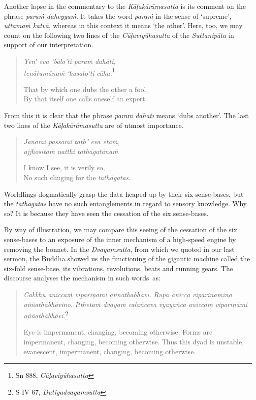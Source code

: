 Another lapse in the commentary to the \emph{Kāḷakārāmasutta} is its comment on the phrase \emph{paraṁ daheyyaṁ}. It takes the word \emph{paraṁ} in the sense of `supreme', \emph{uttamaṁ katvā}, whereas in this context it means `the other'. Here, too, we may count on the following two lines of the \emph{Cūḷaviyūhasutta} of the \emph{Suttanipāta} in support of our interpretation.

\begin{quote}
\emph{Yen' eva `bālo'ti paraṁ dahāti,}\\
\emph{tenātumānaṁ `kusalo'ti cāha.}\footnote{Sn 888, \emph{Cūḷaviyūhasutta}}

That by which one dubs the other a fool,\\
By that itself one calls oneself an expert.
\end{quote}

From this it is clear that the phrase \emph{paraṁ dahāti} means `dubs another'. The last two lines of the \emph{Kāḷakārāmasutta} are of utmost importance.

\begin{quote}
\emph{Jānāmi passāmi tath' eva etaṁ,}\\
\emph{ajjhositaṁ natthi tathāgatānaṁ}.

I know I see, it is verily so,\\
No such clinging for the \emph{tathāgatas}.
\end{quote}

Worldlings dogmatically grasp the data heaped up by their six sense-bases, but the \emph{tathāgatas} have no such entanglements in regard to sensory knowledge. Why so? It is because they have seen the cessation of the six sense-bases.

By way of illustration, we may compare this seeing of the cessation of the six sense-bases to an exposure of the inner mechanism of a high-speed engine by removing the bonnet. In the \emph{Dvayamsutta}, from which we quoted in our last sermon, the Buddha showed us the functioning of the gigantic machine called the six-fold sense-base, its vibrations, revolutions, beats and running gears. The discourse analyses the mechanism in such words~as:

\begin{quote}
\emph{Cakkhu aniccaṁ vipariṇāmi aññathābhāvi. Rūpā aniccā vipariṇāmino aññathābhāvino. Itthetaṁ dvayaṁ calañceva vyayañca aniccaṁ vipariṇāmi aññathābhāvi.}\footnote{S IV 67, \emph{Dutiyadvayamsutta}}

Eye is impermanent, changing, becoming otherwise. Forms are impermanent, changing, becoming otherwise. Thus this dyad is unstable, evanescent, impermanent, changing, becoming otherwise.
\end{quote}

